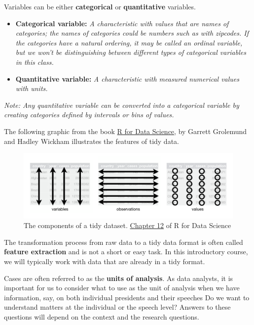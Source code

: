 \documentclass[]{book}
\begin{document}
Variables can be either \textbf{categorical} or \textbf{quantitative} variables.

\begin{itemize}
\item
  \textbf{Categorical variable:} \emph{A characteristic with values that are names of categories; the names of categories could be numbers such as with zipcodes. If the categories have a natural ordering, it may be called an ordinal variable, but we won't be distinguishing between different types of categorical variables in this class.}
\item
  \textbf{Quantitative variable:} \emph{A characteristic with measured numerical values with units.}
\end{itemize}

\emph{Note: Any quantitative variable can be converted into a categorical variable by creating categories defined by intervals or bins of values.}

The following graphic from the book \href{http://r4ds.had.co.nz/}{R for Data Science}, by Garrett Grolemund and Hadley Wickham illustrates the features of tidy data.

\begin{figure}
\centering
\includegraphics{Photos/tidy.png}
\caption{The components of a tidy dataset. \href{http://r4ds.had.co.nz/tidy-data.html}{Chapter 12} of R for Data Science}
\end{figure}

The transformation process from raw data to a tidy data format is often called \textbf{feature extraction} and is not a short or easy task. In this introductory course, we will typically work with data that are already in a tidy format.

Cases are often referred to as the \textbf{units of analysis}. As data analysts, it is important for us to consider what to use as the unit of analysis when we have information, say, on both individual presidents and their speeches Do we want to understand matters at the individual or the speech level? Answers to these questions will depend on the context and the research questions.
\end{document}
